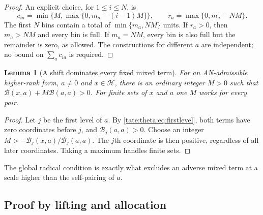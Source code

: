 \documentclass[11pt,letterpaper]{article}
\newtheorem{lemma}[lemma]{Lemma}
\theoremstyle{definition}
\newcommand{\cB}{\mathcal B}
\newcommand{\cH}{\mathcal H}
\begin{document}
\begin{proof}
An explicit choice, for $1\le i\le N$, is
\[
 c_{ia}=\min\{M,\max\{0,m_a-(i-1)M\}\},\qquad
 r_a=\max\{0,m_a-NM\}.
\]
The first $N$ bins contain a total of $\min\{m_a,NM\}$ units. If
$r_a>0$, then $m_a>NM$ and every bin is full. If $m_a=NM$, every bin is
also full but the remainder is zero, as allowed. The constructions for
different $a$ are independent; no bound on $\sum_a c_{ia}$ is required.
\end{proof}

\begin{lemma}[A shift dominates every fixed mixed term]\label{tate:theta:lem:shift}
For an AN-admissible higher-rank form, $a\ne0$ and $x\in\cH$, there is an
ordinary integer $M>0$ such that $\cB(x,a)+M\cB(a,a)>0$. For finite sets of
$x$ and $a$ one $M$ works for every pair.
\end{lemma}

\begin{proof}
Let $j$ be the first level of $a$. By \eqref{tate:theta:eq:firstlevel}, both
terms have zero coordinates before $j$, and $\cB_j(a,a)>0$. Choose an
integer $M>-\cB_j(x,a)/\cB_j(a,a)$. The $j$th coordinate is then positive,
regardless of all later coordinates. Taking a maximum handles finite sets.
\end{proof}

The global radical condition is exactly what excludes an adverse mixed term
at a scale higher than the self-pairing of $a$.

\subsection{Proof by lifting and allocation}
\end{document}
